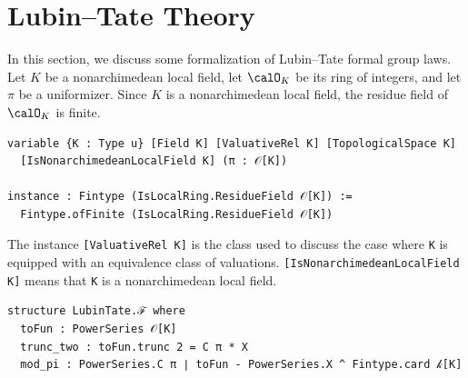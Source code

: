 \section{Lubin--Tate Theory}

In this section, we discuss some formalization of Lubin--Tate formal group laws.
Let $K$ be a nonarchimedean local field, let $\calO_K$ be its ring of integers, and let $\pi$ be
a uniformizer. Since $K$ is a nonarchimedean local field, the residue field of
$\calO_K$ is finite.

\begin{lstlisting}
variable {K : Type u} [Field K] [ValuativeRel K] [TopologicalSpace K]
  [IsNonarchimedeanLocalField K] (π : 𝒪[K])

instance : Fintype (IsLocalRing.ResidueField 𝒪[K]) :=
  Fintype.ofFinite (IsLocalRing.ResidueField 𝒪[K])
\end{lstlisting}

The instance \lstinline|[ValuativeRel K]| is the class used to discuss the
case where \lstinline|K| is equipped with an equivalence class of valuations.
\lstinline|[IsNonarchimedeanLocalField K]| means that \lstinline|K| is a nonarchimedean
local field.

\begin{lstlisting}
structure LubinTate.ℱ where
  toFun : PowerSeries 𝒪[K]
  trunc_two : toFun.trunc 2 = C π * X
  mod_pi : PowerSeries.C π ∣ toFun - PowerSeries.X ^ Fintype.card 𝓀[K]
\end{lstlisting}

